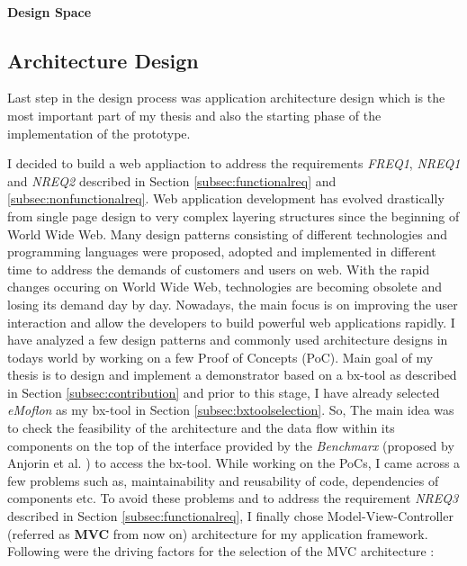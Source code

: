 \paragraph{Design Space} 

\subsection{Architecture Design}\label{subsec:architecturedesign}
Last step in the design process was application architecture design which is the most important part of my thesis and also the starting phase of the implementation of the prototype.

I decided to build a web appliaction to address the requirements \textit{FREQ1}, \textit{NREQ1} and \textit{NREQ2} described in Section \ref{subsec:functionalreq} and \ref{subsec:nonfunctionalreq}.
\newline\newline Web application development has evolved drastically from single page design to very complex layering structures since the beginning of World Wide Web. Many design patterns \cite{designpattern} \cite{designpattern-notes} consisting of different technologies and programming languages were proposed, adopted and implemented in different time to address the demands of customers and users on web. With the rapid changes occuring on World Wide Web, technologies are becoming obsolete and losing its demand day by day. Nowadays, the main focus is on improving the user interaction and allow the developers to build powerful web applications rapidly.
\newline\newline I have analyzed a few design patterns and commonly used architecture designs in todays world by working on a few Proof of Concepts (PoC). Main goal of my thesis is to design and implement a demonstrator based on a bx-tool as described in Section \ref{subsec:contribution} and prior to this stage, I have already selected \textit{eMoflon} as my bx-tool in Section \ref{subsec:bxtoolselection}. So, The main idea was to check the feasibility of the architecture and the data flow within its components on the top of the interface provided by the \textit{Benchmarx} (proposed by Anjorin et al. \cite{benchmarx-reload}) to access the bx-tool. While working on the PoCs, I came across a few problems such as, maintainability and reusability of code, dependencies of components etc. To avoid these problems and to address the requirement \textit{NREQ3} described in Section \ref{subsec:functionalreq}, I finally chose Model-View-Controller (referred as \textbf{MVC} from now on) architecture for my application framework. Following were the driving factors for the selection of the MVC architecture \cite{designpattern-notes} \cite{designpattern-headfirst} :
